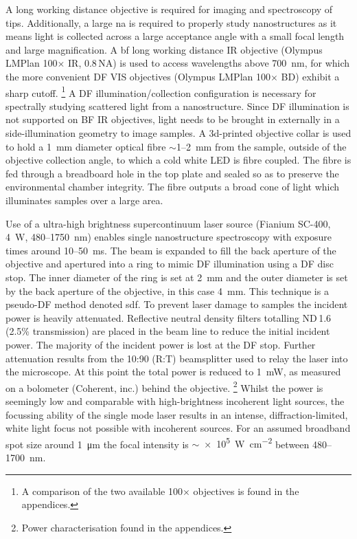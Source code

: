 \documentclass{article}
\begin{document}
A long working distance objective is required for imaging and spectroscopy of tips. Additionally, a large \gls{na} is required to properly study nanostructures as it means light is collected across a large acceptance angle with a small focal length and large magnification. A \gls{bf} long working distance IR objective (Olympus LMPlan 100$\times$ IR, 0.8\,NA) is used to access wavelengths above \SI{700}{nm}, for which the more convenient DF VIS objectives (Olympus LMPlan 100$\times$ BD) exhibit a sharp cutoff.%
\footnote{A comparison of the two available 100$\times$ objectives is found in the appendices.}
A DF illumination/collection configuration is necessary for spectrally studying scattered light from a nanostructure. Since DF illumination is not supported on BF IR objectives, light needs to be brought in externally in a side-illumination geometry to image samples. A 3d-printed objective collar is used to hold a \SI{1}{mm} diameter optical fibre $\sim$1--\SI{2}{mm} from the sample, outside of the objective collection angle, to which a cold white LED is fibre coupled. The fibre is fed through a breadboard hole in the top plate and sealed so as to preserve the environmental chamber integrity. The fibre outputs a broad cone of light which illuminates samples over a large area.

Use of a ultra-high brightness supercontinuum laser source (Fianium SC-400, \SI{4}{W}, 480--\SI{1750}{nm}) enables single nanostructure spectroscopy with exposure times around 10--\SI{50}{ms}. The beam is expanded to fill the back aperture of the objective and apertured into a ring to mimic DF illumination using a DF disc stop. The inner diameter of the ring is set at \SI{2}{mm} and the outer diameter is set by the back aperture of the objective, in this case \SI{4}{mm}. This technique is a pseudo-DF method denoted \gls{sdf}. %
To prevent laser damage to samples the incident power is heavily attenuated. Reflective neutral density filters totalling ND\,1.6 (2.5\% transmission) are placed in the beam line to reduce the initial incident power. The majority of the incident power is lost at the DF stop. Further attenuation results from the 10:90 (R:T) beamsplitter used to relay the laser into the microscope. At this point the total power is reduced to \SI{1}{mW}, as measured on a bolometer (Coherent, inc.) behind the objective.%
\footnote{Power characterisation found in the appendices.}
Whilst the power is seemingly low and comparable with high-brightness incoherent light sources, the focussing ability of the single mode laser results in an intense, diffraction-limited, white light focus not possible with incoherent sources. For an assumed broadband spot size around \SI{1}{\micro\metre} the focal intensity is $\sim${\SI{e5}{\watt\per\centi\metre\squared}} between 480--\SI{1700}{nm}.
\end{document}
